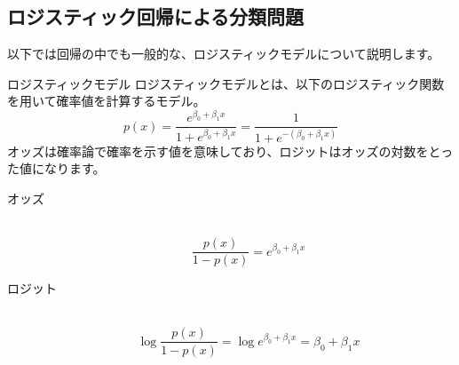 \documentclass[uplatex]{jsarticle}
\begin{document}
\subsection{ロジスティック回帰による分類問題}
以下では回帰の中でも一般的な、ロジスティックモデルについて説明します。
\begin{itembox}[l]{ロジスティックモデル}
  ロジスティックモデルとは、以下のロジスティック関数を用いて確率値を計算するモデル。
  $$p(x) = \frac{e^{\beta_0 + \beta_1x}}{1 + e^{\beta_0 + \beta_1x}} = \frac{1}{1 + e^{-(\beta_0 + \beta_1x)}}$$
  オッズは確率論で確率を示す値を意味しており、ロジットはオッズの対数をとった値になります。
  \begin{description}
    \item[オッズ]\mbox{}\\
    $$\frac{p(x)}{1 - p(x)} = e^{\beta_0 + \beta_1 x}$$
    \item[ロジット]\mbox{}\\
    $$\log{\frac{p(x)}{1 - p(x)}} = \log{e^{\beta_0 + \beta_1 x}} = \beta_0 + \beta_1 x$$
  \end{description}
\end{itembox}
\end{document}
